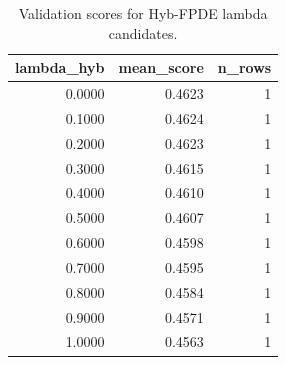 \begin{table}[t]
\caption{Validation scores for Hyb-FPDE lambda candidates.}
\label{tab:lambda_distribution_computed}
\centering
\begin{tabular}{rrr}
\toprule
lambda\_hyb & mean\_score & n\_rows \\
\midrule
0.0000 & 0.4623 & 1 \\
0.1000 & 0.4624 & 1 \\
0.2000 & 0.4623 & 1 \\
0.3000 & 0.4615 & 1 \\
0.4000 & 0.4610 & 1 \\
0.5000 & 0.4607 & 1 \\
0.6000 & 0.4598 & 1 \\
0.7000 & 0.4595 & 1 \\
0.8000 & 0.4584 & 1 \\
0.9000 & 0.4571 & 1 \\
1.0000 & 0.4563 & 1 \\
\bottomrule
\end{tabular}

\end{table}

